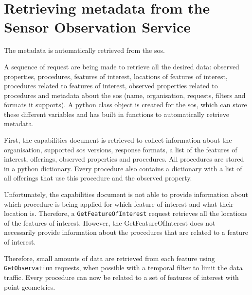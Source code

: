 

\section{Retrieving metadata from the Sensor Observation Service}
The metadata is automatically retrieved from the \ac{sos}.

A sequence of request are being made to retrieve all the desired data: observed properties, procedures, features of interest, locations of features of interest, procedures related to features of interest, observed properties related to procedures and metadata about the \ac{sos} (name, organisation, requests, filters and formats it supports). A python class object is created for the \ac{sos}, which can store these different variables and has built in functions to automatically retrieve metadata. 

First, the capabilities document is retrieved to collect information about the organisation, supported \ac{sos} versions, response formats, a list of the features of interest, offerings, observed properties and procedures. All procedures are stored in a python dictionary. Every procedure also contains a dictionary with a list of all offerings that use this procedure and the observed property. 

Unfortunately, the capabilities document is not able to provide information about which procedure is being applied for which feature of interest and what their location is. Therefore, a \texttt{GetFeatureOfInterest} request retrieves all the locations of the features of interest. However, the GetFeatureOfInterest does not necessarily provide information about the procedures that are related to a feature of interest. 

Therefore, small amounts of data are retrieved from each feature using \texttt{GetObservation} requests, when possible with a temporal filter to limit the data traffic. Every procedure can now be related to a set of features of interest with point geometries.  
 

